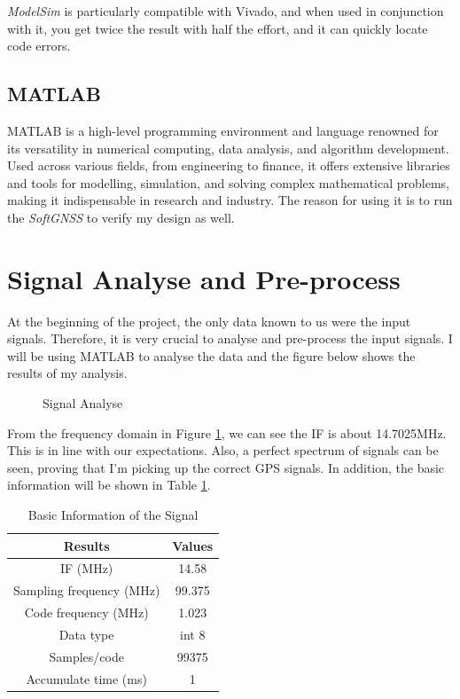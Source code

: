 \textit{ModelSim} is particularly compatible with Vivado, and when used in conjunction with it, you get twice the result with half the effort, and it can quickly locate code errors.

\subsection{MATLAB}
MATLAB is a high-level programming environment and language renowned for its versatility in numerical computing, data analysis, and algorithm development. Used across various fields, from engineering to finance, it offers extensive libraries and tools for modelling, simulation, and solving complex mathematical problems, making it indispensable in research and industry. The reason for using it is to run the \textit{SoftGNSS} to verify my design as well.

\section{Signal Analyse and Pre-process}
At the beginning of the project, the only data known to us were the input signals. Therefore, it is very crucial to analyse and pre-process the input signals. I will be using MATLAB to analyse the data and the figure below shows the results of my analysis.

\begin{figure}[!htbp]
    \centering
    
    \caption{Signal Analyse}
    \label{fig:sig_info}
\end{figure}

From the frequency domain in Figure \ref{fig:sig_info}, we can see the IF is about 14.7025MHz. This is in line with our expectations. Also, a perfect spectrum of signals can be seen, proving that I'm picking up the correct GPS signals. In addition, the basic information will be shown in Table \ref{tab:sig_info}.

\begin{table}[H]
\centering
\renewcommand\arraystretch{1.5}
\caption{Basic Information of the Signal}
\label{tab:sig_info}
\begin{tabular}{cc}
    \toprule
    Results & Values \\
    \midrule
    IF (MHz) & 14.58 \\
    Sampling frequency (MHz) & 99.375 \\
    Code frequency (MHz) & 1.023 \\
    Data type & int 8 \\
    Samples/code & \num{99375} \\
    Accumulate time (ms) & 1 \\
    \bottomrule
\end{tabular}
\end{table}

